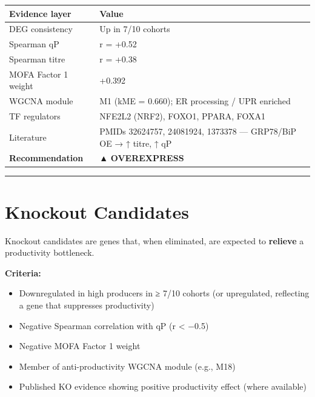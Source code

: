 \documentclass[
  letterpaper,
  oneside,
  open=any]{scrbook}
\newcounter{none} %
\providecommand{\tightlist}{%
  \setlength{\itemsep}{0pt}\setlength{\parskip}{0pt}}
\begin{document}
{\def\LTcaptype{none} %
\begin{longtable}[]{@{}
  >{\raggedright\arraybackslash}p{}
  >{\raggedright\arraybackslash}p{}@{}}
\toprule\noalign{}
\begin{minipage}[b]{\linewidth}\raggedright
Evidence layer
\end{minipage} & \begin{minipage}[b]{\linewidth}\raggedright
Value
\end{minipage} \\
\midrule\noalign{}
\endhead
\bottomrule\noalign{}
\endlastfoot
DEG consistency & Up in 7/10 cohorts \\
Spearman qP & r = +0.52 \\
Spearman titre & r = +0.38 \\
MOFA Factor 1 weight & +0.392 \\
WGCNA module & M1 (kME = 0.660); ER processing / UPR enriched \\
TF regulators & NFE2L2 (NRF2), FOXO1, PPARA, FOXA1 \\
Literature & PMIDs 32624757, 24081924, 1373378 --- GRP78/BiP OE → ↑
titre, ↑ qP \\
\textbf{Recommendation} & ▲ \textbf{OVEREXPRESS} \\
\end{longtable}
}

\begin{center}\rule{0.5\linewidth}{0.5pt}\end{center}

\section{Knockout Candidates}\label{knockout-candidates}

Knockout candidates are genes that, when eliminated, are expected to
\textbf{relieve} a productivity bottleneck.

\textbf{Criteria:}

\begin{itemize}
\tightlist
\item
  Downregulated in high producers in ≥ 7/10 cohorts (or upregulated,
  reflecting a gene that suppresses productivity)
\item
  Negative Spearman correlation with qP (r \textless{} −0.5)
\item
  Negative MOFA Factor 1 weight
\item
  Member of anti-productivity WGCNA module (e.g., M18)
\item
  Published KO evidence showing positive productivity effect (where
  available)
\end{itemize}
\end{document}
